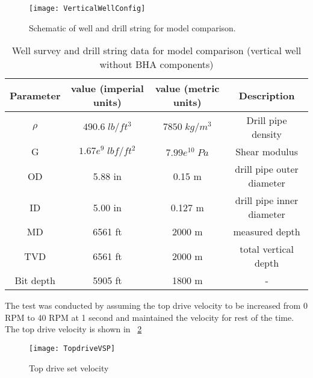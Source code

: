 \begin{figure}[!hbt]
  \centering
  \texttt{[image: VerticalWellConfig]}
  \caption[Schematic of well and drill string for model comparison.]{Schematic of well and drill string for model comparison.}\label{figure_verticalwell}
\end{figure}

\begin{table}[!hbt]
\centering
\begin{tabular}{|c|c|c|c|}
\hline
Parameter & value (imperial units) & value (metric units) & Description\\                                                              
\hline
$\rho$ & $490.6\;lb/ft^3$ & $7850\;kg/m^3$ & Drill pipe density \\                                                  
\hline
G & $1.67e^9\;lbf/ft^2$ & $7.99e^{10}\;Pa$  & Shear modulus \\                                                  
\hline
OD & 5.88 in & 0.15 m & drill pipe outer diameter\\                                                       
\hline
ID & 5.00 in & 0.127 m & drill pipe inner diameter  \\                                                      
\hline
MD & 6561 ft & 2000 m & measured depth\\                                                              
\hline
TVD & 6561 ft & 2000 m & total vertical depth\\
\hline
Bit depth & 5905 ft & 1800 m & - \\ 
\hline
\end{tabular}
\caption[Well survey data for model comparison (vertical well)]{Well survey and drill string data for model comparison (vertical well without BHA components)}\label{table_verticalwell_input}
\end{table}
The test was conducted by assuming the top drive velocity to be increased from 0 RPM to 40 RPM at 1 second and maintained the velocity for rest of the time. The top drive velocity is shown in \figurename~\ref{figure_topdrive_VSP}

\begin{figure}[!hbt]
  \centering
  \texttt{[image: TopdriveVSP]}
  \caption[Top drive set velocity]{Top drive set velocity}\label{figure_topdrive_VSP}
\end{figure}

